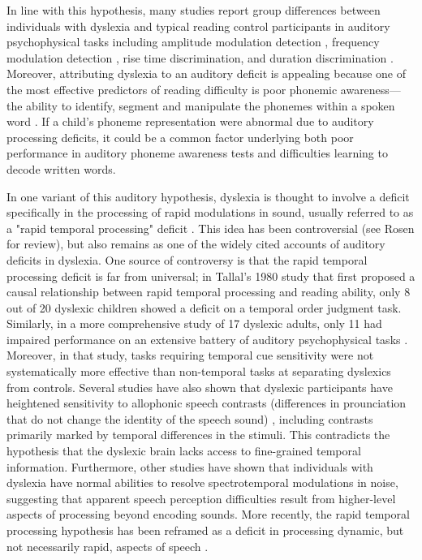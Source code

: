 \documentclass[../uwthesis.tex]{subfiles}
\begin{document}
In line with this hypothesis, many studies report group differences between individuals with dyslexia and typical reading control participants in auditory psychophysical tasks including amplitude modulation detection \cite{Hamalainen2013, McAnally1997,Menell1999,Rocheron2002,Witton1998}, frequency modulation detection \cite{Boets2007,Dawes2009,Gibson2006,Stoodley2006,Witton2002}, rise time discrimination, and duration discrimination \cite{Banai2004,Banai2006,Goswami2011,Thomson2006,Thomson2008}. Moreover, attributing dyslexia to an auditory deficit is appealing because one of the most effective predictors of reading difficulty is poor phonemic awareness---the ability to identify, segment and manipulate the phonemes within a spoken word \cite{Bus1999,Hulme2002}. If a child's phoneme representation were abnormal due to auditory processing deficits, it could be a common factor underlying both poor performance in auditory phoneme awareness tests and difficulties learning to decode written words.

In one variant of this auditory hypothesis, dyslexia is thought to involve a deficit specifically in the processing of rapid modulations in sound, usually referred to as a "rapid temporal processing" deficit \cite{Merzenich1996,Tallal1980,Tallal1996h}. This idea has been controversial (see Rosen \cite{Rosen2003} for review), but also remains as one of the widely cited accounts of auditory deficits in dyslexia. One source of controversy is that the rapid temporal processing deficit is far from universal; in Tallal's 1980 study \cite{Tallal1980} that first proposed a causal relationship between rapid temporal processing and reading ability, only 8 out of 20 dyslexic children showed a deficit on a temporal order judgment task. Similarly, in a more comprehensive study of 17 dyslexic adults, only 11 had impaired performance on an extensive battery of auditory psychophysical tasks \cite{Ramus2003}. Moreover, in that study, tasks requiring temporal cue sensitivity were not systematically more effective than non-temporal tasks at separating dyslexics from controls. Several studies have also shown that dyslexic participants have heightened sensitivity to allophonic speech contrasts (differences in prounciation that do not change the identity of the speech sound) \cite{Bogliotti2008,Noordenbos2015,Serniclaes2004}, including contrasts primarily marked by temporal differences in the stimuli. This contradicts the hypothesis that the dyslexic brain lacks access to fine-grained temporal information. Furthermore, other studies have shown that individuals with dyslexia have normal abilities to resolve spectrotemporal modulations in noise, suggesting that apparent speech perception difficulties result from higher-level aspects of processing beyond encoding sounds. \cite{Calcus2018,Dole2012,Ziegler2009} More recently, the rapid temporal processing hypothesis has been reframed as a deficit in processing dynamic, but not necessarily rapid, aspects of speech \cite{Boets2011,Law2014a,Poelmans2011}.
\end{document}
